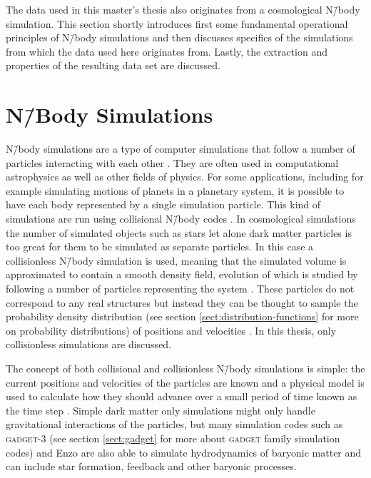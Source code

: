 \documentclass[english, oneside]{HYgradu}
\begin{document}
The data used in this master's thesis also originates from a cosmological N\=/body simulation. This section shortly introduces first some fundamental operational principles of N\=/body simulations and then discusses specifics of the simulations from which the data used here originates from. Lastly, the extraction and properties of the resulting data set are discussed.


\section{N\=/Body Simulations}
N\=/body simulations are a type of computer simulations that follow a number of particles interacting with each other \citep{binney2008galactic}. They are often used in computational astrophysics as well as other fields of physics. For some applications, including for example simulating motions of planets in a planetary system, it is possible to have each body represented by a single simulation particle. This kind of simulations are run using collisional N\=/body codes \citep{binney2008galactic}. In cosmological simulations the number of simulated objects such as stars let alone dark matter particles is too great for them to be simulated as separate particles. In this case a collisionless N\=/body simulation is used, meaning that the simulated volume is approximated to contain a smooth density field, evolution of which is studied by following a number of particles representing the system \citep{binney2008galactic}. These particles do not correspond to any real structures but instead they can be thought to sample the probability density distribution (see section \ref{sect:distribution-functions} for more on probability distributions) of positions and velocities \citep{binney2008galactic}. In this thesis, only collisionless simulations are discussed.

The concept of both collisional and collisionless N\=/body simulations is simple: the current positions and velocities of the particles are known and a physical model is used to calculate how they should advance over a small period of time known as the time step \citep{binney2008galactic}. Simple dark matter only simulations might only handle gravitational interactions of the particles, but many simulation codes such as \textsc{gadget-3} \citep{springel2005cosmological} (see section \ref{sect:gadget} for more about \textsc{gadget} family simulation codes) and Enzo \citep{norman2007simulating} are also able to simulate hydrodynamics of baryonic matter and can include star formation, feedback and other baryonic processes.
\end{document}
